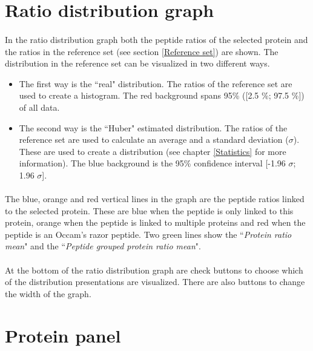 \documentclass[11pt,a4paper,oneside,notitlepage]{book}
\begin{document}
\section{Ratio distribution graph}\label{ratio distribution graph}

\paragraph{}In the ratio distribution graph both the peptide ratios of the selected protein and the ratios in the reference set (see section \ref{Reference set}) are shown. The distribution in the reference set can be visualized in two different ways.

\begin{itemize}
\item The first way is the ``real" distribution. The ratios of the reference set are used to create a histogram. The red background spans 95\% ([2.5 \%; 97.5 \%]) of all data.
\item The second way is the ``Huber" estimated distribution. The ratios of the reference set are used to calculate an average and a standard deviation ($\sigma$). These are used to create a distribution (see chapter \ref{Statistics} for more information). The blue background is the 95\% confidence interval [-1.96 $\sigma$; 1.96 $\sigma$].
\end{itemize}

\paragraph{}The blue, orange and red vertical lines in the graph are the peptide ratios linked to the selected protein. These are blue when the peptide is only linked to this protein, orange when the peptide is linked to multiple proteins and red when the peptide is an Occam's razor peptide. Two green lines show the ``\textit{Protein ratio mean}" and the ``\textit{Peptide grouped protein ratio mean}".

\paragraph{}At the bottom of the ratio distribution graph are check buttons to choose which of the distribution presentations are visualized. There are also buttons to change the width of the graph.

\section{Protein panel}\label{proteinInfoPanel}
\end{document}
